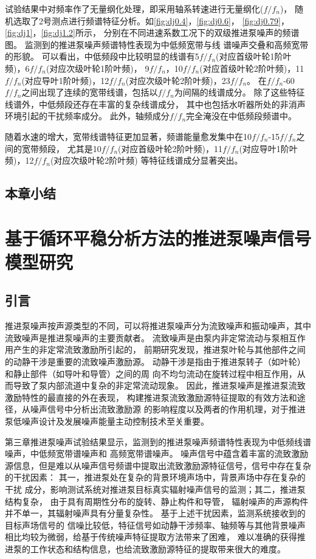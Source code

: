 试验结果中对频率作了无量纲化处理，即采用轴系转速进行无量纲化($f/f_n$)，
随机选取了2号测点进行频谱特征分析。如\autoref{fig:dj0.4}，\autoref{fig:dj0.6}，
\autoref{fig:dj0.79}，\autoref{fig:dj1}，\autoref{fig:dj1.2}所示，
分别在不同进速系数工况下的双级推进泵噪声的频谱图。
监测到的推进泵噪声频谱特性表现为中低频宽带与线
谱噪声交叠和高频宽带的形貌。
可以看出，中低频段中比较明显的线谱有5$f/f_n$(对应首级叶轮1阶叶频)，6$f/f_n$(对应次级叶轮1阶叶频)，
9$f/f_n$，10$f/f_n$(对应首级叶轮2阶叶频)，11$f/f_n$(对应导叶1阶叶频)，12$f/f_n$(对应次级叶轮2阶叶频)，23$f/f_n$。
在$f/f_n$-60$f/f_n$之间出现了连续的宽带线谱，包括以$f/f_n$为间隔的线谱成分。
除了这些特征线谱外，中低频段还存在丰富的复杂线谱成分，
其中也包括水听器所处的非消声环境引起的干扰频率成分。
此外，轴频成分$f/f_n$完全淹没在中低频段频谱中。

随着水速的增大，宽带线谱特征更加显著，频谱能量愈发集中在10$f/f_n$-15$f/f_n$之间的宽带频段，
尤其是10$f/f_n$(对应首级叶轮2阶叶频)，11$f/f_n$(对应导叶1阶叶频)，12$f/f_n$(对应次级叶轮2阶叶频)
等特征线谱成分显著突出。
\section{本章小结}
\chapter{基于循环平稳分析方法的推进泵噪声信号模型研究}
\section{引言}
推进泵噪声按声源类型的不同，可以将推进泵噪声分为流致噪声和振动噪声，其中流致噪声是推进泵噪声的主要贡献者。
流致噪声是由泵内非定常流动与泵相互作用产生的非定常流致激励所引起的，
前期研究发现，推进泵叶轮与其他部件之间的动静干涉是重要的流致噪声激励源。
动静干涉是指由于推进泵转子（如叶轮）和静止部件（如导叶和导管）之间的周
向不均匀流动在旋转过程中相互作用，从而导致了泵内部流道中复杂的非定常流动现象。
因此，推进泵噪声是推进泵流致激励特性的最直接的外在表现，
构建推进泵流致激励源特征提取的有效方法和途径，从噪声信号中分析出流致激励源
的影响程度以及两者的作用机理，对于推进泵低噪声设计及发展噪声能量主动控制技术至关重要。

第三章推进泵噪声试验结果显示，监测到的推进泵噪声频谱特性表现为中低频线谱噪声，中低频宽带谱噪声和
高频宽带谱噪声。
噪声信号中蕴含着丰富的流致激励源信息，但是难以从噪声信号频谱中提取出流致激励源特征信号，信号中存在复杂的干扰因素：
其一，推进泵处在复杂的背景环境声场中，背景声场中存在复杂的干扰
成分，影响测试系统对推进泵目标真实辐射噪声信号的监测；其二，推进泵结构复杂，
由于具有周期性分布的旋转、静止构件和导管，
辐射噪声的声源构件并不单一，其辐射噪声具有分量复杂性。
基于上述干扰因素，监测系统接收到的目标声场信号的
信噪比较低，特征信号如动静干涉频率、轴频等与其他背景噪声相比均较为微弱，给基于传统噪声特征提取方法带来了困难，
难以准确的获得推进泵的工作状态和结构信息，也给流致激励源特征的提取带来很大的难度。


